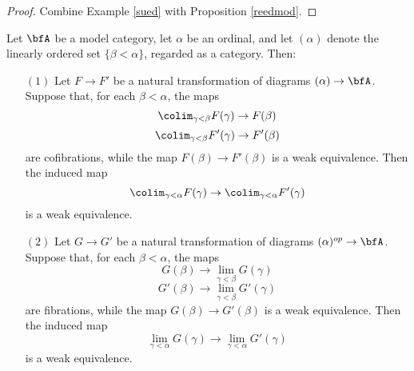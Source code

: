\begin{Model Categories}
\begin{Didn't Read}

\begin{proof}
Combine Example \ref{sued} with Proposition \ref{reedmod}.
\end{proof}

\begin{corollary}\label{jonnyt}
Let $\bfA$ be a model category, let $\alpha$ be an ordinal, and let
$(\alpha)$ denote the linearly ordered set $\{ \beta < \alpha \}$, regarded as a category. Then:
\begin{itemize}
\item[$(1)$] Let $F \rightarrow F'$ be a natural transformation of diagrams
$(\alpha) \rightarrow \bfA$. Suppose that, for each $\beta < \alpha$, the maps
$$ \colim_{\gamma < \beta} F(\gamma) \rightarrow F(\beta)$$
$$ \colim_{\gamma < \beta} F'(\gamma) \rightarrow F'(\beta)$$
are cofibrations, while the map $F(\beta) \rightarrow F'(\beta)$ is a weak equivalence.
Then the induced map $$\colim_{\gamma < \alpha} F(\gamma) \rightarrow \colim_{\gamma < \alpha} F'(\gamma)$$ is a weak equivalence.
\item[$(2)$] Let $G \rightarrow G'$ be a natural transformation of diagrams
$(\alpha)^{op} \rightarrow \bfA$. Suppose that, for each $\beta < \alpha$, the maps
$$ G(\beta) \rightarrow \lim_{\gamma < \beta} G(\gamma)$$
$$ G'(\beta) \rightarrow \lim_{\gamma < \beta} G'(\gamma)$$
are fibrations, while the map $G(\beta) \rightarrow G'(\beta)$ is a weak equivalence.
Then the induced map $$\lim_{\gamma < \alpha} G(\gamma) \rightarrow \lim_{\gamma < \alpha} G'(\gamma)$$ is a weak equivalence.
\end{itemize}
\end{corollary}


\end{Didn't Read}
\end{Model Categories}

